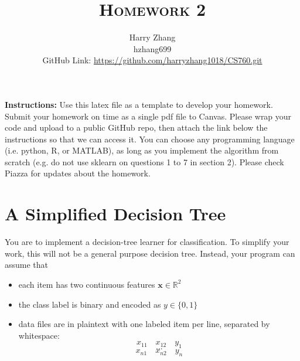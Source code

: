 \documentclass[a4paper]{article}
\title{\textsc{Homework 2}} %
\author{
Harry Zhang \\
hzhang699\\
GitHub Link: \url{https://github.com/harryzhang1018/CS760.git}
}
\date{}
\theoremstyle{definition}
\newcommand{\RR}{\mathbb{R}}
\def\x{\mathbf x}
\begin{document}
\maketitle 


\textbf{Instructions:} 
Use this latex file as a template to develop your homework. Submit your homework on time as a single pdf file to Canvas. Please wrap your code and upload to a public GitHub repo, then attach the link below the instructions so that we can access it. You can choose any programming language (i.e. python, R, or MATLAB), as long as you implement the algorithm from scratch (e.g. do not use sklearn on questions 1 to 7 in section 2). Please check Piazza for updates about the homework.

\section{A Simplified Decision Tree}
You are to implement a decision-tree learner for classification.
To simplify your work, this will not be a general purpose decision tree.  Instead, your program can assume that
\begin{itemize}
\item each item has two continuous features $\x \in \RR^2$
\item the class label is binary and encoded as $y \in \{0,1\}$
\item data files are in plaintext with one labeled item per line, separated by whitespace:
$$x_{11} \quad x_{12} \quad y_1$$
$$...$$
$$x_{n1} \quad x_{n2} \quad y_n$$
\end{itemize}
\end{document}

